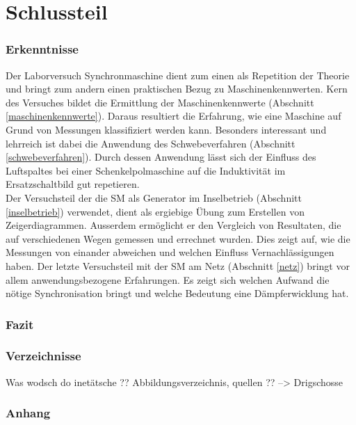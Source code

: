 \part{Schlussteil}



\section{Erkenntnisse}
Der Laborversuch \flqq{}Synchronmaschine\frqq{} dient zum einen als Repetition der Theorie und bringt zum andern einen praktischen Bezug zu Maschinenkennwerten. Kern des Versuches bildet die Ermittlung der Maschinenkennwerte (Abschnitt \ref{maschinenkennwerte}). Daraus resultiert die Erfahrung, wie eine Maschine auf Grund von Messungen klassifiziert werden kann. Besonders interessant und lehrreich ist dabei die Anwendung des Schwebeverfahren (Abschnitt \ref{schwebeverfahren}). Durch dessen Anwendung lässt sich der Einfluss des Luftspaltes bei einer Schenkelpolmaschine auf die Induktivität im Ersatzschaltbild gut repetieren.\\
Der Versuchsteil der die SM als Generator im Inselbetrieb (Abschnitt \ref{inselbetrieb}) verwendet, dient als ergiebige Übung zum Erstellen von Zeigerdiagrammen. Ausserdem ermöglicht er den Vergleich von Resultaten, die auf verschiedenen Wegen gemessen und errechnet wurden. Dies zeigt auf, wie die Messungen von einander abweichen und welchen Einfluss Vernachlässigungen haben. Der letzte Versuchsteil mit der SM am Netz (Abschnitt \ref{netz}) bringt vor allem anwendungsbezogene Erfahrungen. Es zeigt sich welchen Aufwand die nötige Synchronisation bringt und welche Bedeutung eine Dämpferwicklung hat.   


\section{Fazit} %




\section{Verzeichnisse}

Was wodsch do inetätsche ?? Abbildungsverzeichnis, quellen ?? --> Drigschosse

\section{Anhang}